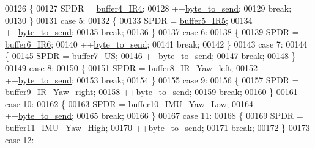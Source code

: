 \begin{DoxyCode}
00126         \{
00127             SPDR = \hyperlink{sensor_8h_a710096596ef17e15194d9557c5ccceff}{buffer4\_IR4};
00128             ++\hyperlink{sensor_8h_addd1a9480a36b7d4c52a1237f5c17286}{byte\_to\_send};
00129             \textcolor{keywordflow}{break};
00130         \}
00131         \textcolor{keywordflow}{case} 5:
00132         \{
00133             SPDR = \hyperlink{sensor_8h_a31b93d4352799841d373eb4f74ed0049}{buffer5\_IR5};
00134             ++\hyperlink{sensor_8h_addd1a9480a36b7d4c52a1237f5c17286}{byte\_to\_send};
00135             \textcolor{keywordflow}{break};
00136         \}
00137         \textcolor{keywordflow}{case} 6:
00138         \{
00139             SPDR = \hyperlink{sensor_8h_a544c2e919dc670aa1624f4f41a9d6fbf}{buffer6\_IR6};
00140             ++\hyperlink{sensor_8h_addd1a9480a36b7d4c52a1237f5c17286}{byte\_to\_send};
00141             \textcolor{keywordflow}{break};
00142         \}
00143         \textcolor{keywordflow}{case} 7:
00144         \{
00145             SPDR = \hyperlink{sensor_8h_aa308e9c1d2a396bb3f3a046ca9693b2d}{buffer7\_US};
00146             ++\hyperlink{sensor_8h_addd1a9480a36b7d4c52a1237f5c17286}{byte\_to\_send};
00147             \textcolor{keywordflow}{break};
00148         \}
00149         \textcolor{keywordflow}{case} 8:
00150         \{
00151             SPDR = \hyperlink{sensor_8h_a9b23fe577ec379483a30362cd1a036f1}{buffer8\_IR\_Yaw\_left};
00152             ++\hyperlink{sensor_8h_addd1a9480a36b7d4c52a1237f5c17286}{byte\_to\_send};
00153             \textcolor{keywordflow}{break};
00154         \}
00155         \textcolor{keywordflow}{case} 9:
00156         \{
00157             SPDR = \hyperlink{sensor_8h_a3526afe7f83bc3aba2c3dfe52423d800}{buffer9\_IR\_Yaw\_right};
00158             ++\hyperlink{sensor_8h_addd1a9480a36b7d4c52a1237f5c17286}{byte\_to\_send};
00159             \textcolor{keywordflow}{break};
00160         \}
00161         \textcolor{keywordflow}{case} 10:
00162         \{
00163             SPDR = \hyperlink{sensor_8h_ad9db200d7187c0cbc24c997f7cdf1eda}{buffer10\_IMU\_Yaw\_Low};
00164             ++\hyperlink{sensor_8h_addd1a9480a36b7d4c52a1237f5c17286}{byte\_to\_send};
00165             \textcolor{keywordflow}{break};
00166         \}
00167         \textcolor{keywordflow}{case} 11:
00168         \{
00169             SPDR = \hyperlink{sensor_8h_a6751f6849033b8cb222c62564455ad7b}{buffer11\_IMU\_Yaw\_High};
00170             ++\hyperlink{sensor_8h_addd1a9480a36b7d4c52a1237f5c17286}{byte\_to\_send};
00171             \textcolor{keywordflow}{break};
00172         \}
00173         \textcolor{keywordflow}{case} 12:

\end{DoxyCode}
